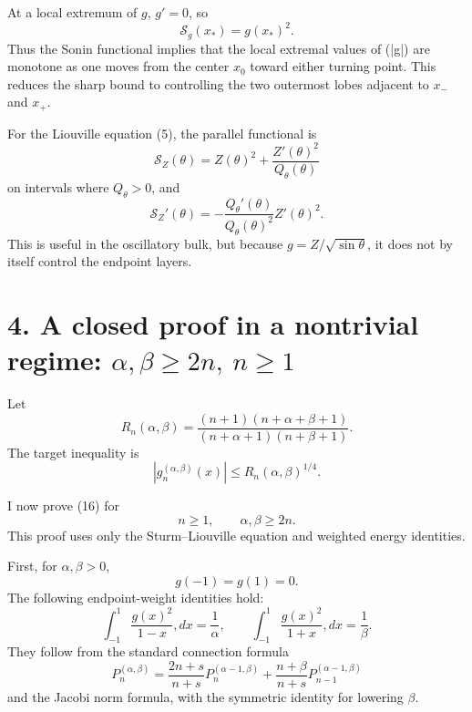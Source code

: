\documentclass[11pt]{article}
\begin{document}
At a local extremum of \(g\), \(g'=0\), so
\begin{equation*}
\mathcal S_g(x_*)=g(x_*)^2.
\end{equation*}
Thus the Sonin functional implies that the local extremal values of (|g|) are monotone as one moves from the center \(x_0\) toward either turning point. This reduces the sharp bound to controlling the two outermost lobes adjacent to \(x_-\) and \(x_+\).

For the Liouville equation (5), the parallel functional is
\begin{equation}
\boxed{
\mathcal S_Z(\theta)
=
Z(\theta)^2+\frac{Z'(\theta)^2}{Q_\theta(\theta)}
}
\tag{14}
\end{equation}
on intervals where \(Q_\theta>0\), and
\begin{equation}
\boxed{
\mathcal S_Z'(\theta)
=
-\frac{Q_\theta'(\theta)}{Q_\theta(\theta)^2}Z'(\theta)^2.
}
\tag{15}
\end{equation}
This is useful in the oscillatory bulk, but because \(g=Z/\sqrt{\sin\theta}\), it does not by itself control the endpoint layers.

\section*{4. A closed proof in a nontrivial regime: \(\alpha,\beta\ge 2n,\ n\ge1\)}

Let
\begin{equation*}
R_n(\alpha,\beta)
=
\frac{(n+1)(n+\alpha+\beta+1)}
{(n+\alpha+1)(n+\beta+1)}.
\end{equation*}
The target inequality is
\begin{equation}
|g_n^{(\alpha,\beta)}(x)|\le R_n(\alpha,\beta)^{1/4}.
\tag{16}
\end{equation}

I now prove (16) for
\begin{equation}
\boxed{
n\ge1,\qquad \alpha,\beta\ge 2n.
}
\tag{17}
\end{equation}
This proof uses only the Sturm–Liouville equation and weighted energy identities.

First, for \(\alpha,\beta>0\),
\begin{equation*}
g(-1)=g(1)=0.
\end{equation*}
The following endpoint-weight identities hold:
\begin{equation}
\boxed{
\int_{-1}^{1}\frac{g(x)^2}{1-x},dx=\frac1\alpha,
\qquad
\int_{-1}^{1}\frac{g(x)^2}{1+x},dx=\frac1\beta.
}
\tag{18}
\end{equation}
They follow from the standard connection formula
\begin{equation*}
P_n^{(\alpha,\beta)}
=
\frac{2n+s}{n+s}P_n^{(\alpha-1,\beta)}
+
\frac{n+\beta}{n+s}P_{n-1}^{(\alpha-1,\beta)}
\end{equation*}
and the Jacobi norm formula, with the symmetric identity for lowering \(\beta\).
\end{document}
